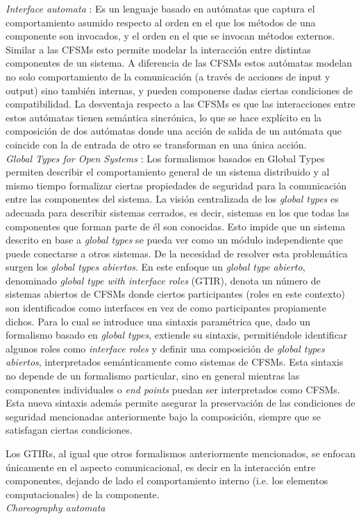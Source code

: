 \emph{Interface automata} \cite{dealfaro:esec-fse-01}: Es un lenguaje basado en autómatas que captura el comportamiento asumido respecto al orden en el que los métodos de una componente son invocados, y el orden en el que se invocan métodos externos. Similar a las CFSMs esto permite modelar la interacción entre distintas componentes de un sistema. A diferencia de las CFSMs estos autómatas modelan no solo comportamiento de la comunicación (a través de acciones de input y output) sino también internas, y pueden componerse dadas ciertas condiciones de compatibilidad. La desventaja respecto a las CFSMs es que las interacciones entre estos autómatas tienen semántica sincrónica, lo que se hace explícito en la composición de dos autómatas donde una acción de salida de un autómata que coincide con la de entrada de otro se transforman en una única acción.\\

\emph{Global Types for Open Systems} \cite{barbanera:eptcs279}: Los formalismos basados en Global Types permiten describir el comportamiento general de un sistema distribuido y al mismo tiempo formalizar ciertas propiedades de seguridad para la comunicación entre las componentes del sistema. La visión centralizada de los \emph{global types} es adecuada para describir sistemas cerrados, es decir, sistemas en los que todas las componentes que forman parte de él son conocidas. Esto impide que un sistema descrito en base a \emph{global types} se pueda ver como un módulo independiente que puede conectarse a otros sistemas. De la necesidad de resolver esta problemática surgen los \emph{global types abiertos}. En este enfoque un \emph{global type abierto}, denominado \emph{global type with interface roles} (GTIR), denota un número de sistemas abiertos de CFSMs donde ciertos participantes (roles en este contexto) son identificados como interfaces en vez de como participantes propiamente dichos. Para lo cual se introduce una sintaxis paramétrica que, dado un formalismo basado en \emph{global types}, extiende su sintaxis, permitiéndole identificar algunos roles como \emph{interface roles} y definir una composición de \emph{global types abiertos}, interpretados semánticamente como sistemas de CFSMs. Esta sintaxis no depende de un formalismo particular, sino en general mientras las componentes individuales o \emph{end points} puedan ser interpretados como CFSMs. Esta nueva sintaxis además permite asegurar la preservación de las condiciones de seguridad mencionadas anteriormente bajo la composición, siempre que se satisfagan ciertas condiciones.

Los GTIRs, al igual que otros formalismos anteriormente mencionados, se enfocan únicamente en el aspecto comunicacional, es decir en la interacción entre componentes, dejando de lado el comportamiento interno (i.e. los elementos computacionales) de la componente.\\

\emph{Choreography automata} \cite{barbanera:coordination20}

